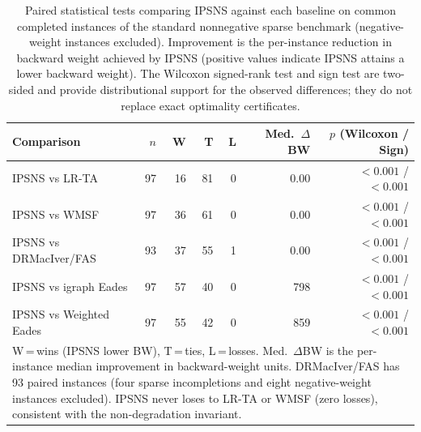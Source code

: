 \begin{table}[htbp]
\centering
\footnotesize
\caption{Paired statistical tests comparing IPSNS against each baseline on
common completed instances of the standard nonnegative sparse benchmark
(negative-weight instances excluded).
Improvement is the per-instance reduction in backward weight achieved by IPSNS
(positive values indicate IPSNS attains a lower backward weight).
The Wilcoxon signed-rank test and sign test are two-sided and
provide distributional support for the observed differences;
they do not replace exact optimality certificates.}
\label{tab:paired_sparse_tests}
\begin{tabular}{lrrrrrr}
\toprule
Comparison & $n$ & W & T & L & Med.\ $\Delta$BW & $p$ (Wilcoxon / Sign) \\
\midrule
IPSNS vs LR-TA & 97 & 16 & 81 & 0 & 0.00 & ${<0.001}$ / ${<0.001}$ \\
IPSNS vs WMSF & 97 & 36 & 61 & 0 & 0.00 & ${<0.001}$ / ${<0.001}$ \\
IPSNS vs DRMacIver/FAS & 93 & 37 & 55 & 1 & 0.00 & ${<0.001}$ / ${<0.001}$ \\
IPSNS vs igraph Eades & 97 & 57 & 40 & 0 & 798 & ${<0.001}$ / ${<0.001}$ \\
IPSNS vs Weighted Eades & 97 & 55 & 42 & 0 & 859 & ${<0.001}$ / ${<0.001}$ \\
\bottomrule
\multicolumn{7}{p{0.95\linewidth}}{\footnotesize
W\,=\,wins (IPSNS lower BW), T\,=\,ties, L\,=\,losses.
Med.\ $\Delta$BW is the per-instance median improvement in backward-weight units.
DRMacIver/FAS has 93 paired instances (four sparse incompletions and eight negative-weight instances excluded).
IPSNS never loses to LR-TA or WMSF (zero losses), consistent with the non-degradation invariant.
} \\
\end{tabular}
\end{table}
